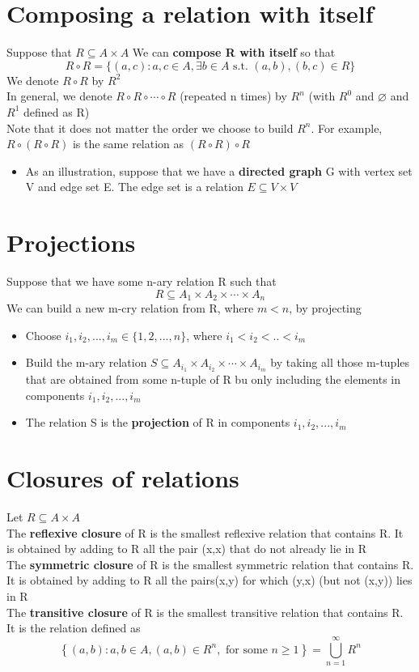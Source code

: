 \documentclass{article}[18pt]
\begin{document}
\section{Composing a relation with itself}
Suppose that $R\subseteq A\times A$ We can \textbf{compose R with itself} so that
$$R \circ R = \{ ( a , c ) : a , c \in A , \exists b \in A \text { s.t. } ( a , b ) , ( b , c ) \in R \}$$
We denote $R\circ R$ by $R^2$\\
In general, we denote $R \circ R \circ \cdots \circ R$ (repeated n times) by $R^n$ (with $R^0$ and $\varnothing$ and $R^1$ defined as R)\\
Note that it does not matter the order we choose to build $R^n$. For example, $R\circ (R\circ R)$ is the same relation as $(R\circ R)\circ R$
\begin{itemize}
	\item As an illustration, suppose that we have a \textbf{directed graph} G with vertex set V and edge set E. The edge set is a relation $E\subseteq V\times V$
\end{itemize}
\section{Projections}
Suppose that we have some n-ary relation R such that
$$R \subseteq A _ { 1 } \times A _ { 2 } \times \cdots \times A _ { n }$$
We can build a new m-cry relation from R, where $m<n$, by projecting
\begin{itemize}
	\item Choose $i_1,i_2,...,i_m\in \{1,2,...,n\}$, where $i_1<i_2<..<i_m$
	\item Build the m-ary relation $S \subseteq A _ { i _ { 1 } } \times A _ { i _ { 2 } } \times \cdots \times A _ { i_m }$ by taking all those m-tuples that are obtained from some n-tuple of R bu only including the elements in components $i_1,i_2,...,i_m$
	\item The relation S is the \textbf{projection} of R in components $i_1,i_2,...,i_m$
\end{itemize}
\section{Closures of relations}
Let $R\subseteq A\times A$\\
The \textbf{reflexive closure} of R is the smallest reflexive relation that contains R. It is obtained by adding to R all the pair (x,x) that do not already lie in R\\
The \textbf{symmetric closure} of R is the smallest symmetric relation that contains R. It is obtained by adding to R all the pairs(x,y) for which (y,x) (but not (x,y)) lies in R\\
The \textbf{transitive closure} of R is the smallest transitive relation that contains R. It is the relation defined as
$$\left\{ ( a , b ) : a , b \in A , ( a , b ) \in R ^ { n } , \text { for some } n \geq 1 \right\} = \bigcup _ { n = 1 } ^ { \infty } R ^ { n }$$
\end{document}
